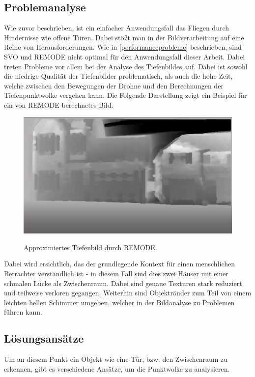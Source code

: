 \subsection{Problemanalyse}
Wie zuvor beschrieben, ist ein einfacher Anwendungsfall das Fliegen durch Hindernisse wie offene Türen. Dabei stößt man in der Bildverarbeitung auf eine Reihe von Herausforderungen. Wie in \ref{performanceprobleme} beschrieben, sind SVO und REMODE nicht optimal für den Anwendungsfall dieser Arbeit. Dabei treten Probleme vor allem bei der Analyse des Tiefenbildes auf. Dabei ist sowohl die niedrige Qualität der Tiefenbilder problematisch, als auch die hohe Zeit, welche zwischen den Bewegungen der Drohne und den Berechnungen der Tiefenpunktwolke vergehen kann. \newline
Die Folgende Darstellung zeigt ein Beispiel für ein von REMODE berechnetes Bild.

\begin{figure}[ht]
	\centering
	\includegraphics[scale=0.5]{Bilder/REMODE.jpg}
	\label{fig:REMODE}
	\caption{Approximiertes Tiefenbild durch REMODE}
\end{figure}

Dabei wird ersichtlich, das der grundlegende Kontext für einen menschlichen Betrachter verständlich ist - in diesem Fall sind dies zwei Häuser mit einer schmalen Lücke als Zwischenraum. Dabei sind genaue Texturen stark reduziert und teilweise verloren gegangen. Weiterhin sind Objektränder zum Teil von einem leichten hellen Schimmer umgeben, welcher in der Bildanalyse zu Problemen führen kann.


\subsection{Lösungsansätze}
Um an diesem Punkt ein Objekt wie eine Tür, bzw. den Zwischenraum zu erkennen, gibt es verschiedene Ansätze, um die Punktwolke zu analysieren.

